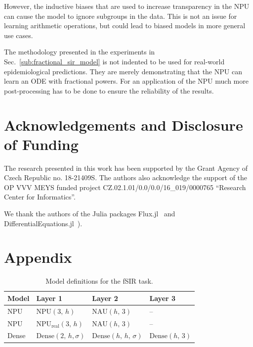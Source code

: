 \documentclass[9pt]{article}
\newcommand{\npu}{\text{NPU}}
\newcommand{\nau}{\text{NAU}}
\newcommand{\dense}{\text{Dense}}
\begin{document}
However, the inductive biases that are used to increase transparency in the NPU
can cause the model to ignore subgroups in the data. This is not an issue for learning
arithmetic operations, but could lead to biased models in more general use cases.

The methodology presented in the experiments in Sec.~\ref{sub:fractional_sir_model}
is not indented to be used for real-world epidemiological predictions.
They are merely demonstrating that the NPU can learn an ODE with fractional powers.
For an application of the NPU much more post-processing has to be done to ensure
the reliability of the results.




\section*{Acknowledgements and Disclosure of Funding}%
\label{sec:acknowledgements}

The research presented in this work has been supported by the Grant Agency of
Czech Republic no. 18-21409S. The authors also acknowledge the support of the
OP VVV MEYS funded project CZ.02.1.01/0.0/0.0/16\_019/0000765 ``Research Center
for Informatics''.

We thank the authors of the Julia packages
Flux.jl~\citep{innes_fashionable_2018} and
DifferentialEquations.jl~\citep{rackauckas_differentialequationsjl_2017}).




\newpage
\appendix
\section*{Appendix}%
\label{sec:appendix}

\setcounter{table}{0}
\renewcommand{\thetable}{A\arabic{table}}

\begin{table}[h]
  \centering
  \caption{Model definitions for the fSIR task.}
  \label{tab:fsir_models}
  \begin{tabular}{llll}
    \toprule
    Model & Layer 1 & Layer 2 & Layer 3 \\
    \midrule
    NPU & $\npu(3,\,h)$ & $\nau(h,\,3)$ & -- \\
    NPU & NPU$_{\text{real}}(3,\,h)$ & $\nau(h,\,3)$ & -- \\
    Dense & $\dense(2,\,h,\sigma)$ & $\dense(h,\,h,\,\sigma)$ & $\dense(h,\,3)$ \\
    \bottomrule
  \end{tabular}
\end{table}
\end{document}

